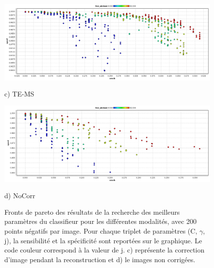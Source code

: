 \begin{figure}[h!]

\begin{center}
\includegraphics[width=14cm]{images/pareto_mod_LOR19.png}
 
{\small c) TE-MS}
\vspace{0.5cm}

\includegraphics[width=14cm]{images/pareto_mod_NoCorr19.png}

{\small d) NoCorr}

\end{center}
 \caption{Fronts de pareto des résultats de la recherche des meilleurs paramètres du classifieur pour les différentes modalités, avec 200 points négatifs par image. Pour chaque triplet de paramètres (C, $\gamma$, j), la sensibilité et la spécificité sont reportées sur le graphique. Le code couleur correspond à la valeur de j. c) représente la correction d'image pendant la reconstruction et d) le images non corrigées.}
\label{fig:paretoModalite19_2} 
\end{figure}


